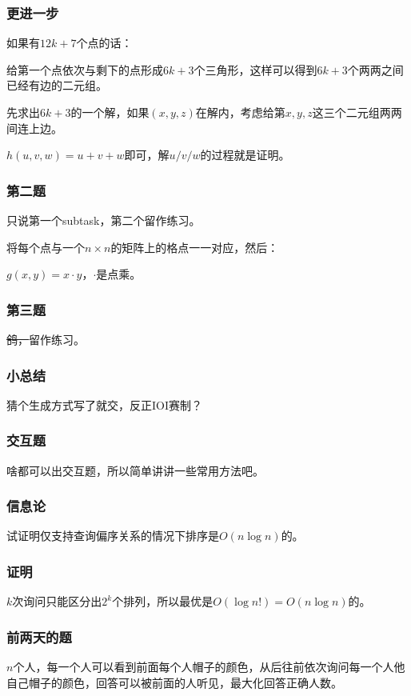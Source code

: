 \documentclass[10pt]{beamer}
\begin{document}
	\clearpage
	\begin{frame}
		\frametitle{更进一步}
	
		如果有$12k+7$个点的话：

		给第一个点依次与剩下的点形成$6k+3$个三角形，这样可以得到$6k+3$个两两之间已经有边的二元组。

		先求出$6k+3$的一个解，如果$(x,y,z)$在解内，考虑给第$x,y,z$这三个二元组两两间连上边。

		$h(u,v,w)=u+v+w$即可，解$u/v/w$的过程就是证明。
	
	\end{frame}
	\clearpage
	\begin{frame}
		\frametitle{第二题}
	
		只说第一个subtask，第二个留作练习。

		将每个点与一个$n\times n$的矩阵上的格点一一对应，然后：

		$g(x,y)=x\cdot y$，$\cdot$是点乘。
	
	\end{frame}
	\clearpage
	\begin{frame}
		\frametitle{第三题}
	
		\sout{鸽，}留作练习。
	
	\end{frame}
	\clearpage
	\begin{frame}
		\frametitle{小总结}
	
		猜个生成方式写了就交，反正IOI赛制？
	
	\end{frame}
	\clearpage
	\begin{frame}
		\frametitle{交互题}
	
		啥都可以出交互题，所以简单讲讲一些常用方法吧。
	
	\end{frame}
	\clearpage
	\begin{frame}
		\frametitle{信息论}
	
		试证明仅支持查询偏序关系的情况下排序是$O(n\log n)$的。
	
	\end{frame}
	\clearpage
	\begin{frame}
		\frametitle{证明}
	
		$k$次询问只能区分出$2^k$个排列，所以最优是$O(\log n!)=O(n\log n)$的。
	
	\end{frame}
	\clearpage
	\begin{frame}
		\frametitle{前两天的题}
	
		$n$个人，每一个人可以看到前面每个人帽子的颜色，从后往前依次询问每一个人他自己帽子的颜色，回答可以被前面的人听见，最大化回答正确人数。
	
	\end{frame}
\end{document}
